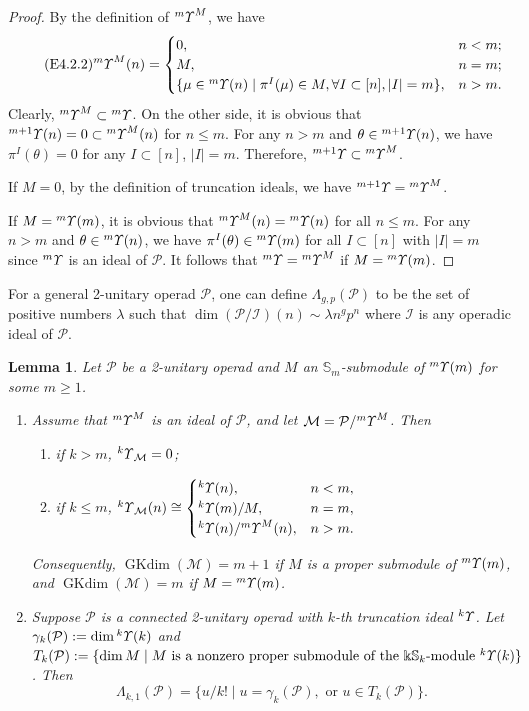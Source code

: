 \documentclass{amsart}
\newtheorem{lem}[thm]{Lemma}
\theoremstyle{definition}
\theoremstyle{remark}
\numberwithin{equation}{section}
\def\S{\mathbb{S}}
\newcommand{\up}[1]{{^{#1}{\it \!\Upsilon}}}
\def \I{\mathcal{I}}
\def \ip{{\mathcal{P}}}
\def \dim{\operatorname{dim}}
\def\gkdim{\operatorname{GKdim}}
\def \S{\mathbb{S}}
\begin{document}
\begin{proof} 
By the definition of $\up{m}^M$, we have 
\begin{equation}
\label{E4.2.2}\tag{E4.2.2}
\up{m}^M(n)=\begin{cases}
0, & n<m;\\
M, & n=m;\\
\{\mu\in \up{m}(n)\mid \pi^I(\mu)\in M, 
\forall I\subset [n], |I|=m\}, & n>m.
\end{cases}
\end{equation}
Clearly,  $\up{m}^M \subset \up{m}$. On the other side, 
it is obvious that $\up{m+1}(n)=0\subset \up{m}^M(n)$ for 
$n\le m$. For any $n>m$ and $\theta\in \up{m+1}(n)$, we 
have $\pi^I(\theta)=0$ for any $I\subset [n]$, $|I|=m$. 
Therefore, $\up{m+1}\subset \up{m}^M$. 

If $M=0$, by the definition of truncation ideals, we have 
$\up{m+1}=\up{m}^M$.

If $M=\up{m}(m)$, it is obvious that 
$\up{m}^M(n)=\up{m}(n)$ for all $n\le m$. For any $n>m$ 
and $\theta\in \up{m}(n)$, we have 
$\pi^I(\theta)\in \up{m}(m)$ for all $I\subset [n]$ with 
$|I|=m$ since $\up{m}$ is an ideal of $\ip$. It 
follows that $\up{m}=\up{m}^M$ if $M=\up{m}(m)$. 
\end{proof}

For a general 2-unitary operad $\ip$, one can define 
$\Lambda_{g,p}(\ip)$ to be the set of positive 
numbers $\lambda$ such that $\dim (\ip/\I)(n)
\sim \lambda n^g p^n$ where $\I$ is any operadic 
ideal of $\ip$.

\begin{lem}
\label{yylem4.3}
Let $\ip$ be a 2-unitary operad and $M$ an $\S_m$-submodule 
of $\up{m}(m)$ for some $m\ge 1$. 
\begin{enumerate}
\item[(1)]
Assume that $\up{m}^M$ is an ideal of $\ip$, and let 
$\mathcal{M}=\ip/\up{m}^M$. Then 
\begin{enumerate}
\item[(1a)] 
if $k>m$, $\up{k}_{\mathcal{M}}=0$;
\item[(1b)] 
if $k\le m$, $\up{k}_{\mathcal{M}}(n)\cong\begin{cases}
\up{k}(n), & n<m,\\
\up{k}(m)/M, & n=m,\\
\up{k}(n)/\up{m}^M(n), & n>m.
\end{cases}$
\end{enumerate}
Consequently, $\gkdim(\mathcal{M})=m+1$ if $M$ is a proper 
submodule of $\up{m}(m)$, and $\gkdim(\mathcal{M})=m$ if 
$M=\up{m}(m)$.
\item[(2)]
Suppose $\ip$ is a connected 2-unitary operad with $k$-th 
truncation ideal $\up{k}$. Let $\gamma_k(\ip):=
\dim \up{k}(k)$ and 
$T_k(\ip):=\{\dim M\mid  M 
\ \mbox{is a nonzero proper submodule of the $\Bbbk\S_k$-module  
$\up{k}(k)$}\}$. Then 
$$\Lambda_{k,1}(\ip)=\{ u/k! \mid u=\gamma_k(\ip), {\text{ or }}
u\in T_k(\ip)\}.$$
\end{enumerate}
\end{lem}
\end{document}
